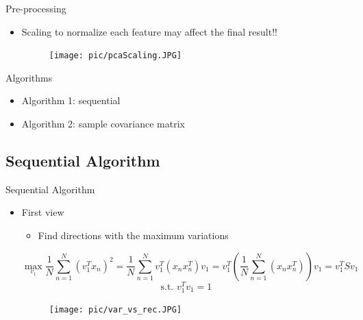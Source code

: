 \documentclass[serif, aspectratio=169]{beamer}
\begin{document}
\begin{frame}{Pre-processing}
    \begin{itemize}
        \item Scaling to normalize each feature may affect the final result!!
        \begin{figure}[htpb]
            \begin{center}
                \texttt{[image: pic/pcaScaling.JPG]}
            \end{center}
        \end{figure}
    \end{itemize}
\end{frame}


\begin{frame}{Algorithms}
    \begin{itemize}
        \item Algorithm 1: sequential
        \item Algorithm 2: sample covariance matrix
    \end{itemize}
\end{frame}

\subsection{Sequential Algorithm}

\begin{frame}{Sequential Algorithm}
    \begin{itemize}
        \item First view
        \begin{itemize}
            \item Find directions with the maximum variations 
        \end{itemize}
        $$
        \max_{v_1} \frac{1}{N} \sum_{n=1}^{N} (v_1^T x_n)^2 = \frac{1}{N} \sum_{n=1}^{N} v_1^T (x_n x_n^T) v_1 = v_1^T \left( \frac{1}{N} \sum_{n=1}^{N}(x_n x_n^T) \right) v_1 = v_1^T S {v_1}
        $$
        $$ \text{s.t. } v_1^{T}{v_1}  = 1$$
        \begin{figure}[htpb]
            \begin{center}
                \texttt{[image: pic/var\_vs\_rec.JPG]}
            \end{center}
        \end{figure}
    \end{itemize}
\end{frame}
\end{document}
